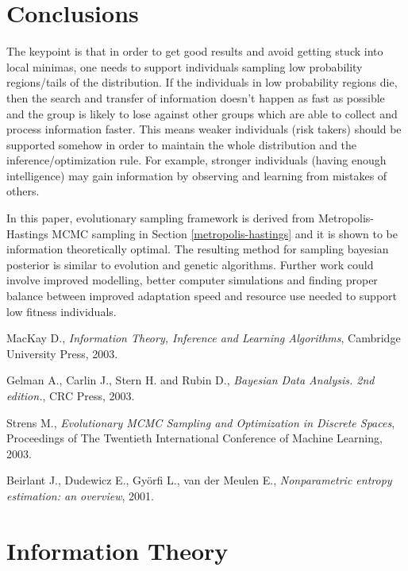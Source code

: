 \documentclass{article}
\begin{document}
\section{Conclusions} \label{conclusions}

The keypoint is that in order to get good results and avoid getting stuck into local minimas, one needs to support individuals sampling low probability regions/tails of the distribution. If the individuals in low probability regions die, then the search and transfer of information doesn't happen as fast as possible and the group is likely to lose against other groups which are able to collect and process information faster. This means weaker individuals (risk takers) should be supported somehow in order to maintain the whole distribution and the inference/optimization rule. For example, stronger individuals (having enough intelligence) may gain information by observing and learning from mistakes of others. 

In this paper, evolutionary sampling framework is derived from Metropolis-Hastings MCMC sampling in Section \ref{metropolis-hastings} and it is shown to be information theoretically optimal. The resulting method for sampling bayesian posterior is similar to evolution and genetic algorithms. Further work could involve improved modelling, better computer simulations and finding proper balance between improved adaptation speed and resource use needed to support low fitness individuals.

\begin{thebibliography}{9}

  MacKay D.,
  \emph{Information Theory, Inference and Learning Algorithms},
  Cambridge University Press,
  2003.

  Gelman A., Carlin J., Stern H. and Rubin D.,
  \emph{Bayesian Data Analysis. 2nd edition.},
  CRC Press, 
  2003.

  Strens M.,
  \emph{Evolutionary MCMC Sampling and Optimization in Discrete Spaces},
  Proceedings of The Twentieth International Conference of Machine Learning,
  2003.

  Beirlant J., Dudewicz E., Györfi L., van der Meulen E.,
  \emph{Nonparametric entropy estimation: an overview},
  2001.

\end{thebibliography}


\appendix
\section{Information Theory} \label{information-theory}
\end{document}
